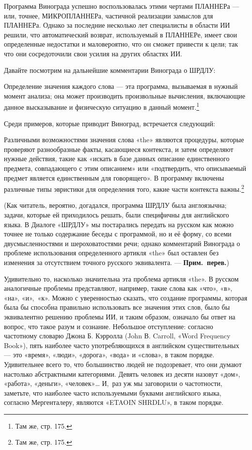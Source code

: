 \documentclass[../main.tex]{subfiles}
\begin{document}
Программа Винограда успешно воспользовалась этими чертами ПЛАННЕРа --- или, точнее, МИКРОПЛАННЕРа, частичной реализации замыслов для ПЛАННЕРа. Однако за последние несколько лет специалисты в области ИИ решили, что автоматический возврат, используемый в ПЛАННЕРе, имеет свои определенные недостатки и маловероятно, что он сможет привести к цели; так что они сосредоточили свои усилия на других областях ИИ.

Давайте посмотрим на дальнейшие комментарии Винограда о ШРДЛУ:

Определение значения каждого слова --- эта программа, вызываемая в нужный момент анализа; она может производить произвольные вычисления, включающие данное высказывание и физическую ситуацию в данный момент.\footnote{Там же, стр. 175.}

Среди примеров, которые приводит Виноград, встречается следующий:

Различными возможностями значения слова «the» являются процедуры, которые проверяют разнообразные факты, касающиеся контекста, и затем определяют нужные действия, такие как «искать в базе данных описание единственного предмета, совпадающего с этим описанием» или «подтвердить, что описываемый предмет является единственным для говорящего». В программу включены различные типы эвристики для определения того, какие части контекста важны.\footnote{Там же, стр. 175.}

(Как читатель, вероятно, догадался, программа ШРДЛУ была англоязычна; задачи, которые ей приходилось решать, были специфичны для английского языка. В Диалоге «ШРДЛУ» мы постарались передать на русском как можно точнее не только содержание беседы с программой, но и её форму, со всеми двусмысленностями и шероховатостями речи; однако комментарий Винограда о проблеме использования определенного артикля «the» был оставлен без изменения за отсутствием точного русского эквивалента. --- \textbf{Прим.\ перев.})

Удивительно то, насколько значительна эта проблема артикля «the». В русском аналогичные проблемы представляют, например, такие слова как «что», «в», «на», «и»,~«к». Можно с уверенностью сказать, что создание программы, которая была бы способна правильно использовать все значения этих слов, было бы эквивалентно решению проблемы ИИ, и таким образом, означало бы ответ на вопрос, что такое разум и сознание. Небольшое отступление: согласно частотному словарю Джона Б. Кэрролла (John В. Carroll, «Word Frequency Book»), пять наиболее часто употребляющихся в английском существительных --- это «время», «люди», «дорога», «вода» и «слова», в таком порядке. Удивительнее всего то, что большинство людей не подозревает, что они думают настолько абстрактными категориями. Девять человек из десяти назовут «дом», «работа», «деньги», «человек»\ldots{} И,~раз уж мы заговорили о частотности, заметьте, что наиболее часто используемыми буквами английского языка, согласно Мергенталеру, являются «ETAOIN SHRDLU», в таком порядке.
\end{document}
